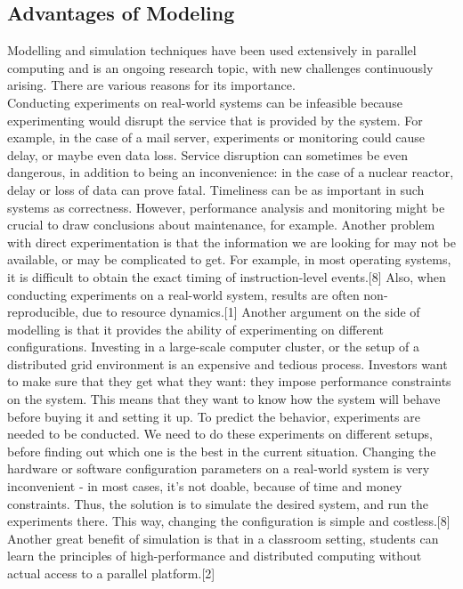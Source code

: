 \documentclass[a4paper]{article}
\begin{document}
\subsection{Advantages of Modeling}
Modelling and simulation techniques have been used extensively in
parallel computing and is an ongoing research topic, with new
challenges continuously arising. There are various reasons for its
importance.\\
Conducting experiments on real-world systems can be
infeasible because experimenting would disrupt the service that is
provided by the system. For example, in the case of a mail server,
experiments or monitoring could cause delay, or maybe even data
loss. Service disruption can sometimes be even dangerous, in addition
to being an inconvenience: in the case of a nuclear reactor, delay or
loss of data can prove fatal. Timeliness can be as important in such
systems as correctness. However, performance analysis and monitoring
might be crucial to draw conclusions about maintenance, for
example. Another problem with direct experimentation is that the
information we are looking for may not be available, or may be
complicated to get. For example, in most operating systems, it is
difficult to obtain the exact timing of instruction-level
events.[8] Also, when conducting experiments on a real-world system,
results are often non-reproducible, due to resource dynamics.[1]
Another argument on the side of modelling is that it provides the
ability of experimenting on different
configurations. Investing in a large-scale computer cluster, or the
setup of a distributed grid environment is an expensive and tedious
process. Investors want to make sure that they get what they
want: they impose performance constraints on the system. This means that
they want to know how the system will behave
before buying it and setting it up. To predict the behavior,
experiments are needed to be conducted. We need to do these
experiments on different setups, before finding out which one is the
best in the current situation. Changing the hardware or software
configuration parameters on a real-world system is very inconvenient -
in most cases, it's not doable, because of time and money
constraints. Thus, the solution is to simulate the desired
system, and run the experiments there. This way, changing the
configuration is simple and costless.[8] Another great benefit of
simulation is that in a classroom setting, students can learn the
principles of high-performance and distributed computing without
actual access to a parallel platform.[2]
\end{document}
